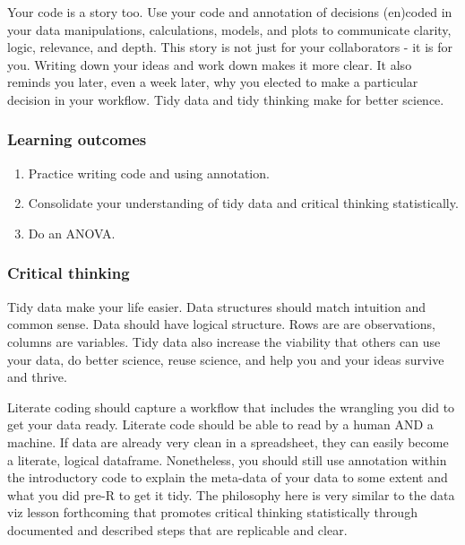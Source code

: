 \documentclass[
]{book}
\providecommand{\tightlist}{%
  \setlength{\itemsep}{0pt}\setlength{\parskip}{0pt}}
\begin{document}
Your code is a story too. Use your code and annotation of decisions (en)coded in your data manipulations, calculations, models, and plots to communicate clarity, logic, relevance, and depth. This story is not just for your collaborators - it is for you. Writing down your ideas and work down makes it more clear. It also reminds you later, even a week later, why you elected to make a particular decision in your workflow. Tidy data and tidy thinking make for better science.

\hypertarget{learning-outcomes-2}{%
\subsubsection*{Learning outcomes}\label{learning-outcomes-2}}

\begin{enumerate}
\def\labelenumi{\arabic{enumi}.}
\tightlist
\item
  Practice writing code and using annotation.\\
\item
  Consolidate your understanding of tidy data and critical thinking statistically.\\
\item
  Do an ANOVA.
\end{enumerate}

\hypertarget{critical-thinking-1}{%
\subsubsection*{Critical thinking}\label{critical-thinking-1}}

Tidy data make your life easier. Data structures should match intuition and common sense. Data should have logical structure. Rows are are observations, columns are variables. Tidy data also increase the viability that others can use your data, do better science, reuse science, and help you and your ideas survive and thrive.

Literate coding \citep{RN4414} should capture a workflow that includes the wrangling you did to get your data ready. Literate code should be able to read by a human AND a machine. If data are already very clean in a spreadsheet, they can easily become a literate, logical dataframe. Nonetheless, you should still use annotation within the introductory code to explain the meta-data of your data to some extent and what you did pre-R to get it tidy. The philosophy here is very similar to the data viz lesson forthcoming that promotes critical thinking statistically through documented and described steps that are replicable and clear.
\end{document}
